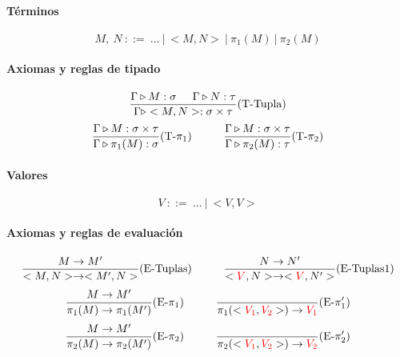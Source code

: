 \documentclass[10pt,a4paper]{article}
\begin{document}
\paragraph{Términos}
$$M,~N~::=~\dots~|~<M,N>~|~\pi_1(M)~|~\pi_2(M)$$
\paragraph{Axiomas y reglas de tipado}
\begin{equation*}
    \frac{\Gamma\triangleright M : \sigma\hspace*{5mm}\Gamma\triangleright N : \tau}{\Gamma\triangleright <M,N> : \sigma\times\tau}(\text{T-Tupla})
\end{equation*}
\vspace*{5mm}
\begin{equation*}
\frac{\Gamma\triangleright M : \sigma\times\tau}{\Gamma\triangleright \pi_1(M) : \sigma}(\text{T-}\pi_1)\hspace*{1cm}\frac{\Gamma\triangleright M : \sigma\times\tau}{\Gamma\triangleright \pi_2(M) : \tau}(\text{T-}\pi_2)
\end{equation*}

\paragraph{Valores}
$$V~::=~\dots~|~<V,V>$$

\paragraph{Axiomas y reglas de evaluación}
\begin{equation*}
\frac{M\to M'}{<M,N>\to<M',N>}(\text{E-Tuplas})\hspace*{1cm}\frac{N\to N'}{<\color{red}V\color{black},N>\to<\color{red}V\color{black},N'>}(\text{E-Tuplas1})
\end{equation*}
\vspace*{5mm}
\begin{equation*}
\frac{M\to M'}{\pi_1(M)\to\pi_1(M')}(\text{E-}\pi_1)\hspace*{1cm}\frac{}{\pi_1(<\color{red}V_1\color{black}, \color{red}V_2\color{black}>)\to\color{red}V_1\color{black}}(\text{E-}\pi'_1)
\end{equation*}
\vspace*{5mm}
\begin{equation*}
\frac{M\to M'}{\pi_2(M)\to\pi_2(M')}(\text{E-}\pi_2)\hspace*{1cm}\frac{}{\pi_2(<\color{red}V_1\color{black}, \color{red}V_2\color{black}>)\to\color{red}V_2\color{black}}(\text{E-}\pi'_2)
\end{equation*}
\end{document}
